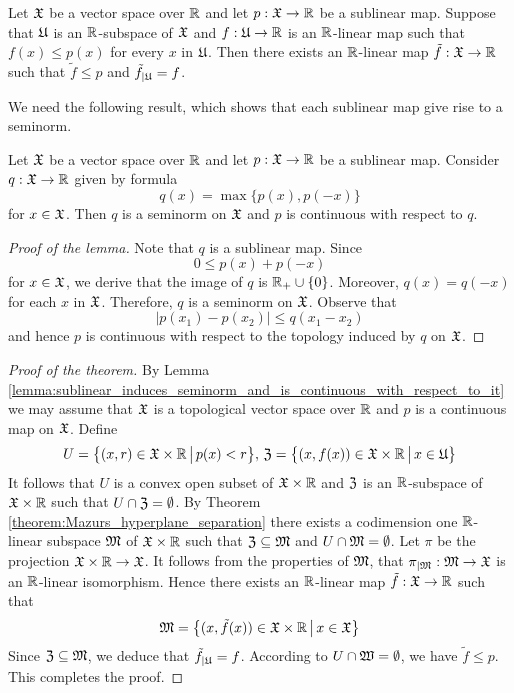 \documentclass[10pt]{amsart}
\begin{document}
\begin{theorem}\label{theorem:Hahn_Banach_real_case}
	Let ${\mathfrak X}$ be a vector space over ${\mathbb R}$ and let $p:{\mathfrak X}\rightarrow {\mathbb R}$ be a sublinear map. Suppose that ${\mathfrak U}$ is an ${\mathbb R}$-subspace of ${\mathfrak X}$ and $f:{\mathfrak U}\rightarrow {\mathbb R}$ is an ${\mathbb R}$-linear map such that $f(x) \leq p(x)$ for every $x$ in ${\mathfrak U}$. Then there exists an ${\mathbb R}$-linear map $\tilde{f}:{\mathfrak X} \rightarrow {\mathbb R}$ such that $\tilde{f} \leq p$ and $\tilde{f}_{\mid {\mathfrak U}} = f$.
\end{theorem}
\noindent
We need the following result, which shows that each sublinear map give rise to a seminorm.

\begin{lemma}\label{lemma:sublinear_induces_seminorm_and_is_continuous_with_respect_to_it}
	Let ${\mathfrak X}$ be a vector space over ${\mathbb R}$ and let $p:{\mathfrak X} \rightarrow {\mathbb R}$ be a sublinear map. Consider $q:{\mathfrak X} \rightarrow {\mathbb R}$ given by formula
	$$q(x) = \max\{p(x),p(-x)\}$$
	for $x \in {\mathfrak X}$. Then $q$ is a seminorm on ${\mathfrak X}$ and $p$ is continuous with respect to $q$.
\end{lemma}
\begin{proof}[Proof of the lemma]
	Note that $q$ is a sublinear map. Since
	$$0\leq p(x) + p(-x)$$
	for $x \in {\mathfrak X}$, we derive that the image of $q$ is ${\mathbb R}_+\cup \{0\}$. Moreover, $q(x) = q(-x)$ for each $x$ in ${\mathfrak X}$. Therefore, $q$ is a seminorm on ${\mathfrak X}$. Observe that
	$$|p(x_1) - p(x_2)|\leq q(x_1 - x_2)$$
	and hence $p$ is continuous with respect to the topology induced by $q$ on ${\mathfrak X}$.
\end{proof}

\begin{proof}[Proof of the theorem]
	By Lemma \ref{lemma:sublinear_induces_seminorm_and_is_continuous_with_respect_to_it} we may assume that ${\mathfrak X}$ is a topological vector space over ${\mathbb R}$ and $p$ is a continuous map on ${\mathfrak X}$. Define
	$$U = \big\{(x,r)\in {\mathfrak X}\times {\mathbb R}\,\big|\,p(x) < r\big\},\,{\mathfrak Z} = \big\{(x,f(x))\in {\mathfrak X}\times {\mathbb R}\,\big|\,x\in {\mathfrak U}\big\}$$
	It follows that $U$ is a convex open subset of ${\mathfrak X}\times {\mathbb R}$ and ${\mathfrak Z}$ is an ${\mathbb R}$-subspace of ${\mathfrak X}\times {\mathbb R}$ such that $U \cap {\mathfrak Z} = \emptyset$. By Theorem \ref{theorem:Mazurs_hyperplane_separation} there exists a codimension one ${\mathbb R}$-linear subspace ${\mathfrak M}$ of ${\mathfrak X}\times {\mathbb R}$ such that ${\mathfrak Z} \subseteq {\mathfrak M}$ and $U\cap {\mathfrak M} = \emptyset$. Let $\pi$ be the projection ${\mathfrak X}\times {\mathbb R}\rightarrow {\mathfrak X}$. It follows from the properties of ${\mathfrak M}$, that $\pi_{\mid {\mathfrak M}}:{\mathfrak M}\rightarrow {\mathfrak X}$ is an ${\mathbb R}$-linear isomorphism. Hence there exists an ${\mathbb R}$-linear map $\tilde{f}:{\mathfrak X} \rightarrow {\mathbb R}$ such that
	$${\mathfrak M} = \big\{(x,\tilde{f}(x))\in {\mathfrak X}\times {\mathbb R}\,\big|\,x \in {\mathfrak X}\big\}$$
	Since ${\mathfrak Z} \subseteq {\mathfrak M}$, we deduce that $\tilde{f}_{\mid {\mathfrak U}} = f$. According to $U\cap {\mathfrak W} = \emptyset$, we have $\tilde{f} \leq p$. This completes the proof.
\end{proof}
\end{document}

